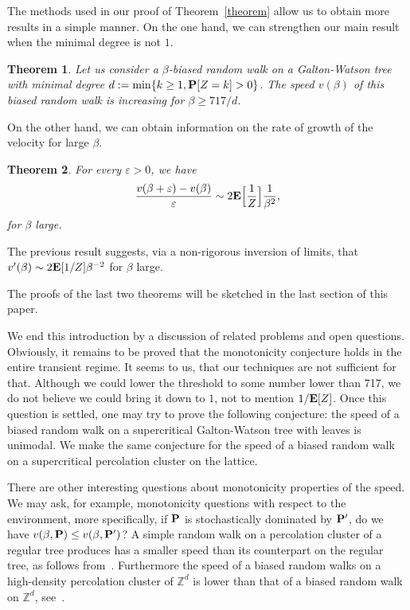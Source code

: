 \documentclass[12pt]{amsart}
\numberwithin{equation}{section}
\newtheorem{theorem}{Theorem}[section]
\begin{document}
 The methods used in our proof of Theorem~\ref{theorem} allow us to obtain more results in a simple manner. On the one hand, we can strengthen our main result when the minimal degree is not $1$.
 \begin{theorem}
\label{theorem2}
Let us consider a $\beta$-biased random walk on a Galton-Watson tree with minimal degree $d:=\min\{k\geq 1, {\bf P}[Z=k] >0\}$. The speed $v(\beta)$ of this biased random walk is increasing for $\beta \geq 717/d$.
\end{theorem}
 
 On the other hand, we can obtain information on the rate of growth of the velocity for large $\beta$.
 \begin{theorem}
\label{theorem3}
For every ${\varepsilon}>0$, we have
\[
\frac{v(\beta+{\varepsilon})-v(\beta)}{\varepsilon}\sim 2{\bf E}\Bigl[\frac 1Z\Bigr]\frac 1 {\beta^2},
\]
for $\beta$ large.
\end{theorem}

The previous result suggests, via a non-rigorous inversion of limits, that $ v'(\beta)\sim 2{\bf E}[1/Z]\beta^{-2}$ for $\beta$ large.

The proofs of the last two theorems will be sketched in the last section of this paper.
 
We end this introduction by a discussion of related problems and open questions. Obviously, it remains to be proved that the monotonicity conjecture holds in the entire transient regime. It seems to us, that our techniques are not sufficient for that. Although we could lower the threshold to some number lower than 717, we do not believe we could bring it down to $1$, not to mention $1/{\bf E}[Z]$. Once this question is settled, one may try to prove the following conjecture: the speed of a biased random walk on a supercritical Galton-Watson tree with leaves is unimodal. We make the same conjecture for the speed of a biased random walk on a supercritical percolation cluster on the lattice.

There are other interesting questions about monotonicity properties of the speed. We may ask, for example, monotonicity  questions with respect to the environment, more specifically, if ${\bf P}$ is stochastically dominated by ${\bf P}'$, do we have $v(\beta,{\bf P})\leq v(\beta,{\bf P}')$? A simple random walk on a percolation cluster of a regular tree  produces has a smaller speed than its counterpart on the regular tree, as follows from~\cite{Chen}. Furthermore the speed of a biased random walks on a high-density percolation cluster of ${\mathbb{Z}}^d$ is lower than that of a biased random walk on ${\mathbb{Z}}^d$, see~\cite{Fribergh}.
\end{document}
